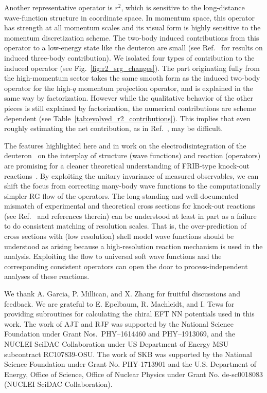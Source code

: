\documentclass[10pt,aps,prc,floatfix,twocolumn,nofootinbib]{revtex4-1}
\begin{document}
Another representative operator is $r^2$, which is sensitive to the long-distance wave-function structure in coordinate space.
In momentum space, this operator has strength at all momentum scales and its visual form is highly sensitive to the momentum discretization scheme.
The two-body induced contributions from this operator to a low-energy state like the deuteron are small (see Ref.~\cite{Schuster:2014lga} for results on induced three-body contribution).
We isolated four types of contribution to the induced operator (see Fig.~\ref{fig:r2_srg_changes}).
The part originating fully from the high-momentum sector takes the same smooth form as the induced two-body operator for the high-$q$ momentum projection operator, and is explained in the same way by factorization.
However while the qualitative behavior of the other pieces is still explained by factorization, the numerical contributions are scheme dependent (see Table~\ref{tab:evolved_r2_contributions}).
This implies that even roughly estimating the net contribution, as in Ref.~\cite{Miller:2018mfb}, may be difficult.


The features highlighted here and in work on the electrodisintegration of the deuteron~\cite{More:2015tpa,More:2017syr} on the interplay of structure (wave functions) and reaction (operators) are promising for a cleaner theoretical understanding of FRIB-type knock-out reactions~\cite{Moro:2018mdk}.
By exploiting the unitary invariance of measured observables, we can shift the focus from correcting many-body wave functions to the computationally simpler RG flow of the operators. 
The long-standing and well-documented mismatch of experimental and theoretical cross sections for knock-out reactions (see Ref.~\cite{Tostevin:2014usa} and references therein) can be understood at least in part as a failure to do consistent matching of resolution scales.
That is, the over-prediction of cross sections with (low resolution) shell model wave functions should be understood as arising because a high-resolution reaction mechanism is used in the analysis. 
Exploiting the flow to universal soft wave functions and the corresponding consistent operators can open the door to process-independent analyses of these reactions.


\begin{acknowledgments}
We thank A. Garcia, P. Millican, and X. Zhang for fruitful discussions and feedback.
We are grateful to E. Epelbaum, R. Machleidt, and I. Tews for providing subroutines for calculating the chiral EFT NN potentials used in this work.
The work of AJT and RJF was supported by the National Science Foundation under Grant Nos.~PHY--1614460 and PHY--1913069, and the NUCLEI SciDAC Collaboration under US Department of Energy MSU subcontract RC107839-OSU\@.
The work of SKB was supported by the National Science Foundation under Grant No. PHY-1713901 and the U.S. Department of Energy, Office of Science, Office of Nuclear Physics under Grant No. de-sc0018083 (NUCLEI SciDAC Collaboration).
\end{acknowledgments}



\end{document}
